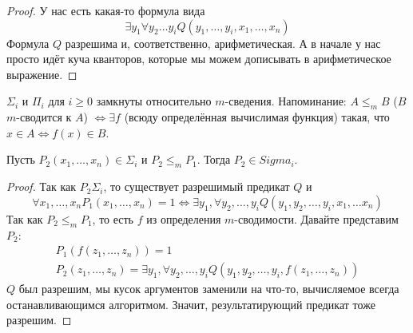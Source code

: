 	\begin{proof}
		У нас есть какая-то формула вида
		\[\exists y_1 \forall y_2 \dots y_i Q(y_1, \dots, y_i, x_1, \dots, x_n)\]
		Формула $Q$ разрешима и, соответственно, арифметическая.
		А в начале у нас просто идёт куча кванторов, которые мы можем дописывать в арифметическое выражение.
	\end{proof}

\item
	$\Sigma_i$ и $\Pi_i$ для $i \ge 0$ замкнуты относительно $m$-сведения.
	Напоминание: $A \le_m B $ ($B$ $m$-сводится к $A$) $\iff \exists f$ (всюду определённая вычислимая функция) такая,
	что $x \in A \iff f(x) \in B$.

	Пусть $P_2(x_1, \dots, x_n) \in \Sigma_i$ и $P_2 \le_m P_1$.
	Тогда $P_2 \in Sigma_i$.
	\begin{proof}
		Так как $P_2 \Sigma_i$, то существует разрешимый предикат $Q$ и
		\[ \forall x_1, \dots, x_n P_1(x_1, \dots, x_n)=1 \iff \exists y_1, \forall y_2, \dots, y_i Q(y_1, y_2, \dots, y_i, x_1, \dots x_n) \]
		Так как $P_2 \le_m P_1$, то есть $f$ из определения $m$-сводимости.
		Давайте представим $P_2$:
		\begin{gather*}
		P_1(f(z_1, \dots, z_n)) = 1 \\
		P_2(z_1, \dots, z_n) = \exists y_1, \forall y_2, \dots, y_i Q(y_1, y_2, \dots, y_i, f(z_1, \dots, z_n))
		\end{gather*}
		$Q$ был разрешим, мы кусок аргументов заменили на что-то, вычисляемое всегда останавливающимся
		алгоритмом.
		Значит, результатирующий предикат тоже разрешим.
	\end{proof}

